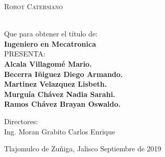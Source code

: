 \documentclass[letter,operight,12pt,spanish]{report}
\begin{document}
%
%
%
%
%
%
%
%
%
%
%
%
%
%
%
\begin{minipage}[l][0.78\textheight][t]{0.1\textwidth}
    \begin{center}
    \hskip0pt
    \vrule width2.5pt height17cm    %
        \hskip1mm
        \vrule width1pt height17cm  %
        \end{center}
\end{minipage}
\begin{minipage}[c][0.78\textheight][t]{0.8\textwidth}
      \begin{center}
      \vspace{2cm}
        {\Large \scshape {Robot Catersiano}}

        \vspace{2cm}

          \\[20pt]
        Que para obtener el título de:\\[5pt]
        {\Large \textbf{{Ingeniero en Mecatronica}}}\\[40pt]
        PRESENTA:\\[12pt]
        \textbf{ \Large {Alcala Villagom\'e Mario.\\
        				Becerra I\~niguez Diego Armando.\\
        				Martinez Velazquez Lisbeth.\\
        				Murgu\'ia Ch\'avez Nadia Sarahi.\\
        				Ramos Ch\'avez Brayan Oswaldo.}}

        \vspace{2cm}

        { \small Directores}:\\ {Ing. Moran Grabito Carlos Enrique}

        \vspace{2.5cm}

        { Tlajomulco de Zuñiga, Jalisco} \hskip2.5cm {Septiembre de 2019}
      \end{center}
\end{minipage}
\end{document}
